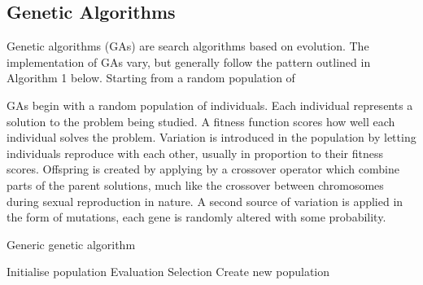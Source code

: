 
\subsection{Genetic Algorithms}
\newline
{}
\newline
Genetic algorithms (GAs) are search algorithms based on evolution. The implementation of GAs vary, but
generally follow the pattern outlined in Algorithm 1 below. Starting from a random population of 

GAs begin with
a random population of individuals. Each individual represents a solution to the problem being
studied. A fitness function scores how well each individual solves the problem. Variation is introduced 
in the population by letting individuals reproduce with each other, usually in proportion to their fitness 
scores. Offspring is created by applying by a crossover operator which combine parts of the parent solutions, 
much like the crossover between chromosomes during sexual reproduction in nature. A second source of variation
is applied in the form of mutations, each gene is randomly altered with some probability.


\begin{algorithm}[H]
    \caption{Generic genetic algorithm}
    \begin{algorithmic}

    \State Initialise population
        \State Evaluation 
        \State Selection  
        \State Create new population 
    \EndWhile
\EndProcedure

\end{algorithmic}
\end{algorithm}

